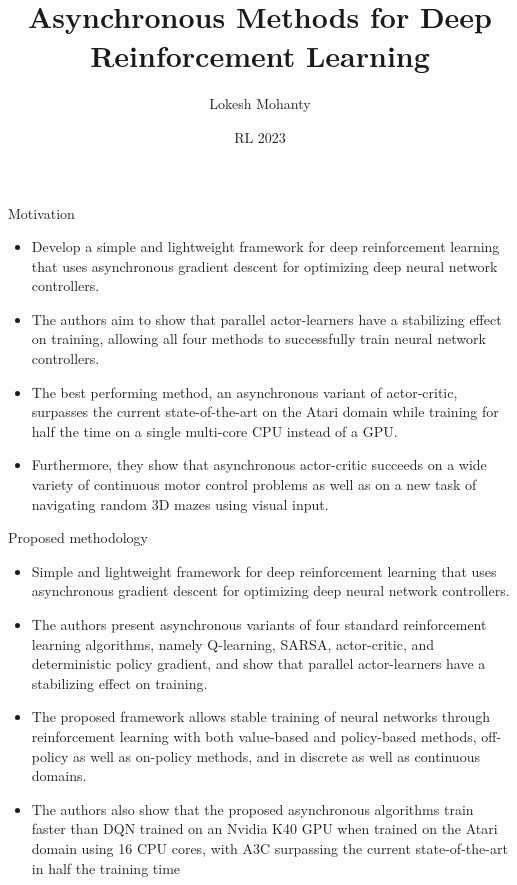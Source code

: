 \documentclass[aspectratio=169]{beamer}
\author{Lokesh Mohanty}
\date{RL 2023}
\title{Asynchronous Methods for Deep Reinforcement Learning}
\institute[IISc]{ Department of Computational and Data Sciences\\ Indian Institute of Science}
\begin{document}
\maketitle

\begin{frame}[label={sec:org5e69319}]{Motivation}
\begin{itemize}
\item Develop a simple and lightweight framework for deep reinforcement learning that uses asynchronous gradient descent for optimizing deep neural network controllers.
\item The authors aim to show that parallel actor-learners have a stabilizing effect on training, allowing all four methods to successfully train neural network controllers.
\item The best performing method, an asynchronous variant of actor-critic, surpasses the current state-of-the-art on the Atari domain while training for half the time on a single multi-core CPU instead of a GPU.
\item Furthermore, they show that asynchronous actor-critic succeeds on a wide variety of continuous motor control problems as well as on a new task of navigating random 3D mazes using visual input.
\end{itemize}
\end{frame}
\begin{frame}[label={sec:org8c3c737}]{Proposed methodology}
\begin{itemize}
\item Simple and lightweight framework for deep reinforcement learning that uses asynchronous gradient descent for optimizing deep neural network controllers.
\item The authors present asynchronous variants of four standard reinforcement learning algorithms, namely Q-learning, SARSA, actor-critic, and deterministic policy gradient, and show that parallel actor-learners have a stabilizing effect on training.
\item The proposed framework allows stable training of neural networks through reinforcement learning with both value-based and policy-based methods, off-policy as well as on-policy methods, and in discrete as well as continuous domains.
\item The authors also show that the proposed asynchronous algorithms train faster than DQN trained on an Nvidia K40 GPU when trained on the Atari domain using 16 CPU cores, with A3C surpassing the current state-of-the-art in half the training time
\end{itemize}
\end{frame}
\end{document}
